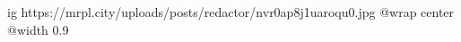  
 
 
 
 

\ifcmt
  ig https://mrpl.city/uploads/posts/redactor/nvr0ap8j1uaroqu0.jpg
  @wrap center
  @width 0.9
\fi
